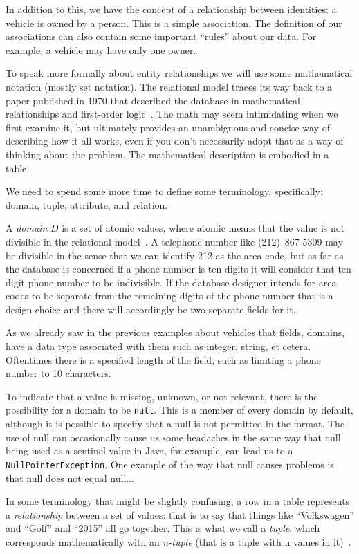 \documentclass[a4paper]{report}
\begin{document}
In addition to this, we have the concept of a relationship between identities: a vehicle is owned by a person. This is a simple association. The definition of our associations can also contain some important ``rules'' about our data. For example, a vehicle may have only one owner.

To speak more formally about entity relationships we will use some mathematical notation (mostly set notation). The relational model traces its way back to a paper published in 1970 that described the database in mathematical relationships and first-order logic~\cite{codd}. The math may seem intimidating when we first examine it, but ultimately provides an unambiguous and concise way of describing how it all works, even if you don't necessarily adopt that as a way of thinking about the problem. The mathematical description is embodied in a table. 

We need to spend some more time to define some terminology, specifically: domain, tuple, attribute, and relation.  

A \textit{domain} $D$ is a set of atomic values, where atomic means that the value is not divisible in the relational model~\cite{fds}. A telephone number like {(212)~867-5309} may be divisible in the sense that we can identify 212 as the area code, but as far as the database is concerned if a phone number is ten digits it will consider that ten digit phone number to be indivisible. If the database designer intends for area codes to be separate from the remaining digits of the phone number that is a design choice and there will accordingly be two separate fields for it. 

As we already saw in the previous examples about vehicles that fields, domains, have a data type associated with them such as integer, string, et cetera. Oftentimes there is a specified length of the field, such as limiting a phone number to 10 characters. 

To indicate that a value is missing, unknown, or not relevant, there is the possibility for a domain to be \texttt{null}. This is a member of every domain by default, although it is possible to specify that a null is not permitted in the format. The use of null can occasionally cause us some headaches in the same way that null being used as a sentinel value in Java, for example, can lead us to a \texttt{NullPointerException}. One example of the way that null causes problems is that null does not equal null... 

In some terminology that might be slightly confusing, a row in a table represents a \textit{relationship} between a set of values: that is to say that things like ``Volkswagen'' and ``Golf'' and ``2015'' all go together. This is what we call a \textit{tuple}, which corresponds mathematically with an \textit{n-tuple} (that is a tuple with n values in it)~\cite{dsc}. 
\end{document}
